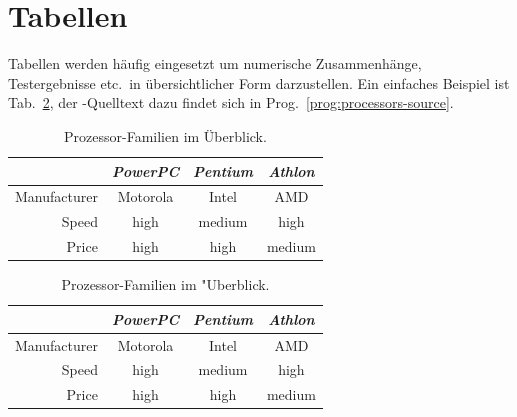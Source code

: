 \section{Tabellen}

Tabellen werden häufig eingesetzt um numerische Zusammenhänge, Testergebnisse
etc.\ in übersichtlicher Form darzustellen.
Ein einfaches Beispiel ist Tab.~\ref{tab:processors}, der \latex-Quelltext dazu
findet sich in Prog.~\ref{prog:processors-source}.


\begin{table}
\caption{Prozessor-Familien im Überblick.}
\label{tab:processors}
\centering
\setlength{\tabcolsep}{5mm}	%
\def\arraystretch{1.25}		%
\begin{tabular}{|r||c|c|c|} \hline
& \emph{PowerPC} & \emph{Pentium} & \emph{Athlon} \\
\hline\hline
Manufacturer & Motorola & Intel & AMD \\
\hline
Speed & high & medium & high   \\
\hline
Price & high & high   & medium \\
\hline
\end{tabular}
\end{table}

\begin{program}
\caption{\latex\ Quelltext zu Tab.~\ref{tab:processors}.
Die Erzeugung des dargestellten Listings selbst ist in Abschn.\ \ref{sec:programmtexte} beschrieben.}
\label{prog:processors-source}
%
\begin{LaTeXCode}
\begin{table}
\caption{Prozessor-Familien im "Uberblick.}
\label{tab:processors}
\centering
\setlength{\tabcolsep}{5mm}	%
\def\arraystretch{1.25}		%
\begin{tabular}{|r||c|c|c|} \hline
& \emph{PowerPC} & \emph{Pentium} & \emph{Athlon} \\
\hline\hline
Manufacturer & Motorola & Intel & AMD \\
\hline
Speed & high & medium & high   \\
\hline
Price & high & high   & medium \\
\hline
\end{tabular}
\end{table}
\end{LaTeXCode}
%
\end{program}

